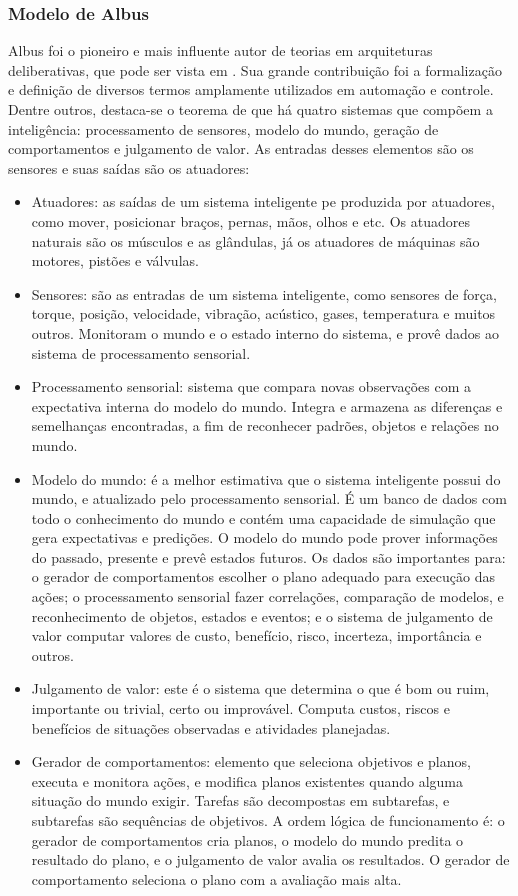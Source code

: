 \subsubsection{Modelo de Albus}

Albus foi o pioneiro e mais influente autor de teorias em arquiteturas
deliberativas, que pode ser vista em \cite{albus1991outline}. Sua
grande contribuição foi a formalização e definição de diversos termos
amplamente utilizados em automação e controle. Dentre outros, destaca-se o
teorema de que há quatro sistemas que compõem a inteligência: processamento de
sensores, modelo do mundo, geração de comportamentos e julgamento de valor. As
entradas desses elementos são os sensores e suas saídas são os atuadores:

\begin{itemize}
  \item Atuadores: as saídas de um sistema inteligente pe produzida por
  atuadores, como mover, posicionar braços, pernas, mãos, olhos e etc. Os
  atuadores naturais são os músculos e as glândulas, já os atuadores de máquinas
  são motores, pistões e válvulas.
  \item Sensores: são as entradas de um sistema inteligente, como sensores de
  força, torque, posição, velocidade, vibração, acústico, gases, temperatura e
  muitos outros. Monitoram o mundo e o estado interno do sistema, e provê dados
  ao sistema de processamento sensorial.
  \item Processamento sensorial: sistema que compara novas observações com a
  expectativa interna do modelo do mundo. Integra e armazena as diferenças e
  semelhanças encontradas, a fim de reconhecer padrões, objetos e relações no
  mundo.
  \item Modelo do mundo: é a melhor estimativa que o sistema inteligente possui
  do mundo, e atualizado pelo processamento sensorial. É um banco de dados com
  todo o conhecimento do mundo e contém uma capacidade de simulação que gera expectativas e predições. O modelo do mundo
  pode prover informações do passado, presente e prevê estados futuros.
  Os dados são importantes para: o gerador de comportamentos escolher o plano
  adequado para execução das ações; o processamento sensorial fazer correlações,
  comparação de modelos, e reconhecimento de objetos, estados e eventos; e o
  sistema de julgamento de valor computar valores de custo, benefício, risco,
  incerteza, importância e outros.
  \item Julgamento de valor: este é o sistema que determina o que é bom ou ruim,
  importante ou trivial, certo ou improvável. Computa custos, riscos e
  benefícios de situações observadas e atividades planejadas.
  \item Gerador de comportamentos: elemento que seleciona objetivos e planos,
  executa e monitora ações, e modifica planos existentes quando alguma situação
  do mundo exigir. Tarefas são decompostas em subtarefas, e subtarefas são
  sequências de objetivos. A ordem lógica de funcionamento é: o gerador de
  comportamentos cria planos, o modelo do mundo predita o resultado do plano, e
  o julgamento de valor avalia os resultados. O gerador de comportamento
  seleciona o plano com a avaliação mais alta.
\end{itemize}

